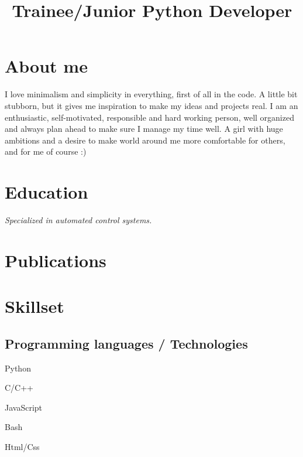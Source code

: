 \documentclass[12pt,a4paper,sans]{moderncv}        %
\title{Trainee/Junior Python Developer}                               %
\begin{document}
\makecvtitle
\section{About me}
\textcolor{color1}{I love minimalism and simplicity in everything, first of all in the code. A little bit stubborn, but it gives me inspiration to make my ideas and projects real. I am an enthusiastic, self-motivated, responsible and hard working person, well organized and always plan ahead to make sure I manage my time well. A girl with huge ambitions and a desire to make world around me more comfortable for others, and for me of course :)}
\section{Education}
\textit{Specialized in automated control systems.}  %

\section{Publications}
\section{Skillset}
\subsection{Programming languages / Technologies}
\begin{itemize}
\begin{multicols}{2}
\item Python 
\item C/C++
\item JavaScript
\item Bash 
\item Html/Css
\end{multicols}
\end{itemize}
\end{document}
